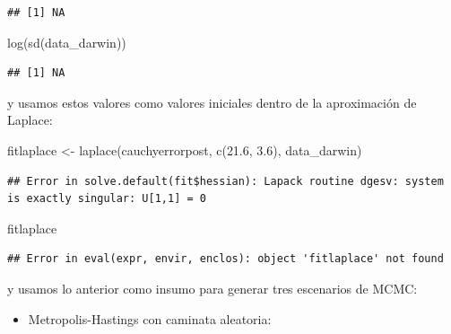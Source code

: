\documentclass[
  12pt,
]{book}
\newenvironment{Shaded}{\begin{snugshade}}{\end{snugshade}}
\newcommand{\AttributeTok}[1]{\textcolor[rgb]{0.77,0.63,0.00}{#1}}
\newcommand{\FloatTok}[1]{\textcolor[rgb]{0.00,0.00,0.81}{#1}}
\newcommand{\FunctionTok}[1]{\textcolor[rgb]{0.00,0.00,0.00}{#1}}
\newcommand{\NormalTok}[1]{#1}
\newcommand{\OtherTok}[1]{\textcolor[rgb]{0.56,0.35,0.01}{#1}}
\newcommand{\SpecialCharTok}[1]{\textcolor[rgb]{0.00,0.00,0.00}{#1}}
\providecommand{\tightlist}{%
  \setlength{\itemsep}{0pt}\setlength{\parskip}{0pt}}
\theoremstyle{definition}
\theoremstyle{definition}
\theoremstyle{definition}
\theoremstyle{definition}
\theoremstyle{remark}
\begin{document}
\begin{verbatim}
## [1] NA
\end{verbatim}

\begin{Shaded}
\begin{Highlighting}[]
\FunctionTok{log}\NormalTok{(}\FunctionTok{sd}\NormalTok{(data\_darwin))}
\end{Highlighting}
\end{Shaded}

\begin{verbatim}
## [1] NA
\end{verbatim}

y usamos estos valores como valores iniciales dentro de la aproximación de Laplace:

\begin{Shaded}
\begin{Highlighting}[]
\NormalTok{fitlaplace }\OtherTok{\textless{}{-}} \FunctionTok{laplace}\NormalTok{(cauchyerrorpost, }\FunctionTok{c}\NormalTok{(}\FloatTok{21.6}\NormalTok{, }\FloatTok{3.6}\NormalTok{),}
\NormalTok{    data\_darwin)}
\end{Highlighting}
\end{Shaded}

\begin{verbatim}
## Error in solve.default(fit$hessian): Lapack routine dgesv: system is exactly singular: U[1,1] = 0
\end{verbatim}

\begin{Shaded}
\begin{Highlighting}[]
\NormalTok{fitlaplace}
\end{Highlighting}
\end{Shaded}

\begin{verbatim}
## Error in eval(expr, envir, enclos): object 'fitlaplace' not found
\end{verbatim}

y usamos lo anterior como insumo para generar tres escenarios de MCMC:

\begin{itemize}
\tightlist
\item
  Metropolis-Hastings con caminata aleatoria:
\end{itemize}

\begin{Shaded}
\end{Shaded}
\end{document}
